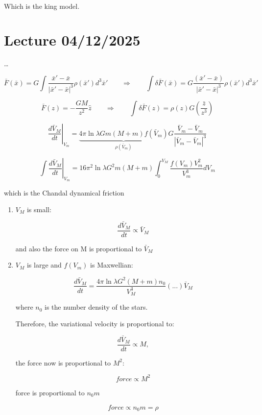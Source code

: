 Which is the king model.




\chapter{Lecture 04/12/2025}

\dots

$$
\bar F(\bar x) = G \int \dfrac{\bar x' - \bar x}{|\bar x' - \bar x|^3} \rho(\bar x') d^3 \bar x'
\qquad \Rightarrow \qquad
\int \delta \bar F(\bar x) = G \dfrac{(\bar x' - \bar x)} {|\bar x' - \bar x|^3} \rho(\bar x') d^3 \bar x'
$$

$$
\bar F(z) = - \dfrac{G M}{z^2} \hat z \qquad \Rightarrow \qquad \int \delta \bar F(z) = \rho(z) G \left( \dfrac{\bar z}{z^3} \right)
$$

$$
\left.\dfrac{d\bar V_M}{dt}\right|_{V_m} = \underbrace{4 \pi \ln \lambda G m (M+m) f(\bar V_m)}_{\rho(\bar V_m)} G \dfrac{\bar V_m - \bar V_m}{|\bar V_m - \bar V_m|^3}
$$

$$
\int \left.\dfrac{d\bar V_M}{dt}\right|_{V_m} = 16 \pi^2 \ln \lambda G^2 m (M+m) \int_0^{V_M} \dfrac{f(V_m)V_m^2}{V_m^3} dV_m
$$

which is the Chandal dynamical friction

\begin{enumerate}
    \item $V_M$ is small:
    
    $$
    \dfrac{d\bar V_M}{dt} \propto \bar V_M
    $$

    and also the force on M is proportional to $\bar V_M$

    \item $V_M$ is large and $f(V_m)$ is Maxwellian:
    
    $$
    \dfrac{d\bar V_M}{dt} = \dfrac{4 \pi \ln \lambda G^2 (M + m)n_0}{V_M^3} (...) \bar V_M
    $$

    where $n_0$ is the number density of the stars.

    Therefore, the variational velocity is proportional to:

    $$
    \dfrac{d\bar V_M}{dt} \propto M,
    $$

    the force now is proportional to $M^2$:

    $$
    force \propto M^2
    $$

    force is proportional to $n_0m$

    $$
    force \propto n_0m = \rho
    $$

\end{enumerate}

